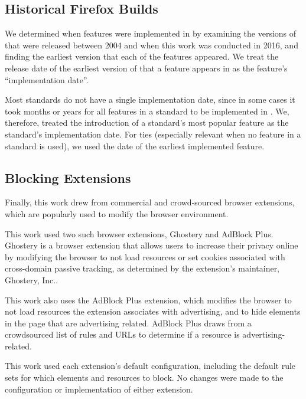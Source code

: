 \subsection{Historical Firefox Builds}
We determined when features were implemented in \FF by
examining the \numfirefoxes versions of \FF that were released between 2004
and when this work was conducted in 2016, and finding the earliest version
that each of the \numfeatures features appeared.
We treat the release date of the earliest version of
\FF that a feature appears in as the feature's ``implementation date''.

Most standards do not have a single implementation date, since in some cases
it took months or years for all features in a standard to be
implemented in \FF.  We, therefore, treated the introduction of a standard's
most popular feature as the standard's implementation date. For ties
(especially relevant when no feature in a standard is used), we
used the date of the earliest implemented feature.


\subsection{Blocking Extensions}
\label{measurement:data-sources:data-extensions}
Finally, this work drew from commercial and crowd-sourced browser extensions,
which are popularly used to modify the browser environment.

This work used two such browser extensions, Ghostery and AdBlock Plus.
Ghostery is a browser extension that allows users to increase their privacy
online by modifying the browser to not load resources or set cookies associated
with cross-domain passive tracking, as determined by the extension's
maintainer, Ghostery, Inc..

This work also uses the AdBlock Plus extension, which modifies
the browser to not load resources the extension associates with
advertising, and to hide elements in the page that are advertising related.
AdBlock Plus draws from a crowdsourced list of rules and URLs to determine
if a resource is advertising-related.

This work used each extension's default configuration, including the default
rule sets for which elements and resources to block.  No changes were made to
the configuration or implementation of either extension.

